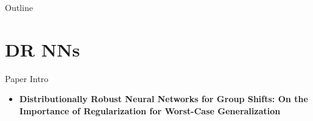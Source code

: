 \documentclass{beamer}
\begin{document}




\begin{viterbiframe}{Outline}
\tableofcontents
\end{viterbiframe}

% 


\section{DR NNs}
\begin{viterbiframe}{{Paper Intro}}
\begin{itemize}
    \item {\bf Distributionally Robust Neural Networks for Group Shifts: On the Importance of Regularization for Worst-Case Generalization}
\end{itemize}
\end{viterbiframe}
\end{document}
